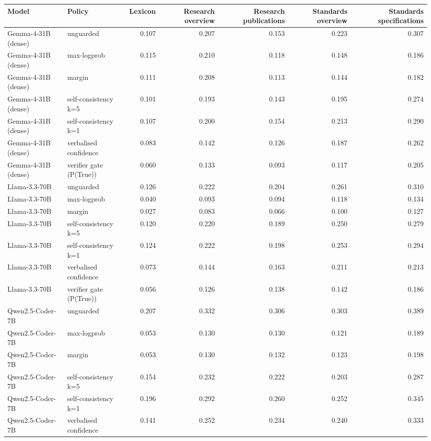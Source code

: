 \begin{tabular}{llrrrrr}
\toprule
Model & Policy & Lexicon & Research overview & Research publications & Standards overview & Standards specifications \\
\midrule
Gemma-4-31B (dense) & unguarded & 0.107 & 0.207 & 0.153 & 0.223 & 0.307 \\
Gemma-4-31B (dense) & max-logprob & 0.115 & 0.210 & 0.118 & 0.148 & 0.186 \\
Gemma-4-31B (dense) & margin & 0.111 & 0.208 & 0.113 & 0.144 & 0.182 \\
Gemma-4-31B (dense) & self-consistency k=5 & 0.101 & 0.193 & 0.143 & 0.195 & 0.274 \\
Gemma-4-31B (dense) & self-consistency k=1 & 0.107 & 0.200 & 0.154 & 0.213 & 0.290 \\
Gemma-4-31B (dense) & verbalised confidence & 0.083 & 0.142 & 0.126 & 0.187 & 0.262 \\
Gemma-4-31B (dense) & verifier gate (P(True)) & 0.060 & 0.133 & 0.093 & 0.117 & 0.205 \\
Llama-3.3-70B & unguarded & 0.126 & 0.222 & 0.204 & 0.261 & 0.310 \\
Llama-3.3-70B & max-logprob & 0.040 & 0.093 & 0.094 & 0.118 & 0.134 \\
Llama-3.3-70B & margin & 0.027 & 0.083 & 0.066 & 0.100 & 0.127 \\
Llama-3.3-70B & self-consistency k=5 & 0.120 & 0.220 & 0.189 & 0.250 & 0.279 \\
Llama-3.3-70B & self-consistency k=1 & 0.124 & 0.222 & 0.198 & 0.253 & 0.294 \\
Llama-3.3-70B & verbalised confidence & 0.073 & 0.144 & 0.163 & 0.211 & 0.213 \\
Llama-3.3-70B & verifier gate (P(True)) & 0.056 & 0.126 & 0.138 & 0.142 & 0.186 \\
Qwen2.5-Coder-7B & unguarded & 0.207 & 0.332 & 0.306 & 0.303 & 0.389 \\
Qwen2.5-Coder-7B & max-logprob & 0.053 & 0.130 & 0.130 & 0.121 & 0.189 \\
Qwen2.5-Coder-7B & margin & 0.053 & 0.130 & 0.132 & 0.123 & 0.198 \\
Qwen2.5-Coder-7B & self-consistency k=5 & 0.154 & 0.232 & 0.222 & 0.203 & 0.287 \\
Qwen2.5-Coder-7B & self-consistency k=1 & 0.196 & 0.292 & 0.260 & 0.252 & 0.345 \\
Qwen2.5-Coder-7B & verbalised confidence & 0.141 & 0.252 & 0.234 & 0.240 & 0.333 \\

\end{tabular}
